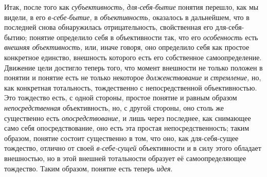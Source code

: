 Итак, после того как
{\em субъективность,}
{\em для-себя-бытие}
понятия перешло, как мы видели, в его
{\em в-себе-бытие,} в
{\em объективность,}
оказалось в дальнейшем, что в последней снова обнаружилась
отрицательность, свойственная его для-себя-бытию; понятие определило себя в
объективности так, что его
{\em особенность} есть
{\em внешняя объективность,}
или, иначе говоря, оно определило себя как простое конкретное
единство, внешность которого есть его собственное самоопределение. Движение
цели достигло теперь того, что момент внешности не только положен в понятии
и понятие есть не только некоторое
{\em долженствование} и
{\em стремление,} но, как
конкретная тотальность, тождественно с непосредственной объективностью. Это
тождество есть, с одной стороны, простое понятие и равным образом
{\em непосредственная}
объективность, но, с другой стороны, оно столь же существенно
есть {\em опосредствование,}
и лишь через последнее, как снимающее само себя
опосредствование, оно есть эта простая непосредственность; таким образом,
понятие состоит существенно в том, что оно, как для-себя-сущее тождество,
отлично от своей
{\em в-себе-сущей}
объективности и в силу этого обладает внешностью, но в этой
внешней тотальности образует её самоопределяющее тождество. Таким образом,
понятие есть теперь {\em идея}.

\clearpage

